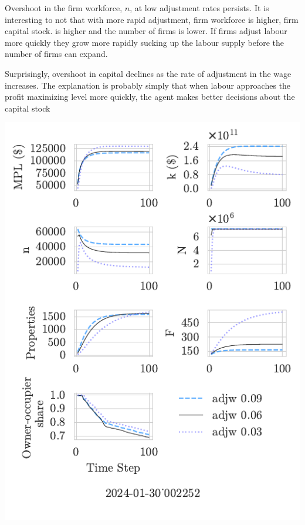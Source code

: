 \documentclass{article}
\begin{document}
Overshoot in the firm workforce, $n$, at low adjustment rates persists. It is interesting to not that with more rapid adjustment,  firm workforce is higher, firm capital stock. is higher and the number of firms is lower. If firms adjust labour more quickly they grow more rapidly sucking  up the labour supply before the number of firms can expand. 

Surprisingly, overshoot in capital declines as the rate of adjustment in the wage increases. The explanation is probably simply that when labour approaches  the profit maximizing level more quickly, the agent makes better decisions about the capital stock



 \includegraphics[]{fig/Analysis/adjw-2024-01-30_002252.pdf}
\end{document}
